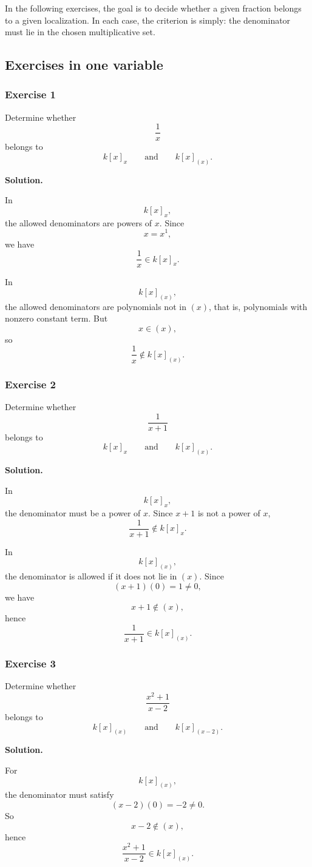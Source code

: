 \documentclass[12pt,a4paper]{article}
\theoremstyle{notespace}
\theoremstyle{definition}
\begin{document}
In the following exercises, the goal is to decide whether a given fraction belongs to a given localization. In each case, the criterion is simply: the denominator must lie in the chosen multiplicative set.

\subsection{Exercises in one variable}

\subsubsection{Exercise 1}

Determine whether
\[
\frac{1}{x}
\]
belongs to
\[
k[x]_x
\qquad\text{and}\qquad
k[x]_{(x)}.
\]

\textbf{Solution.}

In
\[
k[x]_x,
\]
the allowed denominators are powers of \(x\). Since
\[
x=x^1,
\]
we have
\[
\frac{1}{x}\in k[x]_x.
\]

In
\[
k[x]_{(x)},
\]
the allowed denominators are polynomials not in \((x)\), that is, polynomials with nonzero constant term. But
\[
x\in (x),
\]
so
\[
\frac{1}{x}\notin k[x]_{(x)}.
\]

\subsubsection{Exercise 2}

Determine whether
\[
\frac{1}{x+1}
\]
belongs to
\[
k[x]_x
\qquad\text{and}\qquad
k[x]_{(x)}.
\]

\textbf{Solution.}

In
\[
k[x]_x,
\]
the denominator must be a power of \(x\). Since \(x+1\) is not a power of \(x\),
\[
\frac{1}{x+1}\notin k[x]_x.
\]

In
\[
k[x]_{(x)},
\]
the denominator is allowed if it does not lie in \((x)\). Since
\[
(x+1)(0)=1\neq 0,
\]
we have
\[
x+1\notin (x),
\]
hence
\[
\frac{1}{x+1}\in k[x]_{(x)}.
\]

\subsubsection{Exercise 3}

Determine whether
\[
\frac{x^2+1}{x-2}
\]
belongs to
\[
k[x]_{(x)}
\qquad\text{and}\qquad
k[x]_{(x-2)}.
\]

\textbf{Solution.}

For
\[
k[x]_{(x)},
\]
the denominator must satisfy
\[
(x-2)(0)=-2\neq 0.
\]
So
\[
x-2\notin (x),
\]
hence
\[
\frac{x^2+1}{x-2}\in k[x]_{(x)}.
\]
\end{document}
